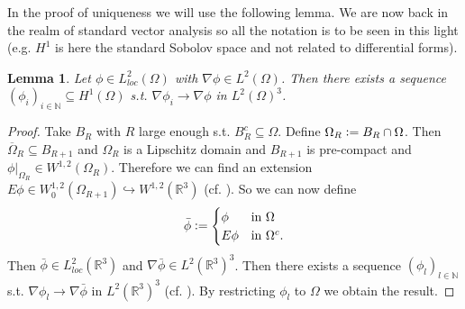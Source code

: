\documentclass[12pt,a4paper]{article}
\numberwithin{equation}{subsection}
\newtheorem{lemma}{Lemma}[section]
\numberwithin{lemma}{subsection}
\theoremstyle{definition}
\newcommand{\naturalnum}{\mathbb{N}}
\newcommand{\real}{\mathbb{R}}
\begin{document}
In the proof of uniqueness we will use the following lemma. 
We are now back in the realm of standard vector analysis so all the notation
is to be seen in this light (e.g. $H^1$ is here the standard Sobolov space 
and not related to differential forms).

\begin{lemma}\label{lem:gradient_sequence}
    Let $\phi \in L^2_{loc}(\Omega)$ with $\nabla \phi \in L^2(\Omega)$. Then 
    there exists a sequence $(\phi_i)_{i \in \naturalnum} \subseteq H^1(\Omega)$
    s.t. $\nabla \phi_i \rightarrow \nabla \phi$ in $L^2(\Omega)^3$.
\end{lemma}
\begin{proof}
    Take $B_R$ with $R$ large enough s.t. $B_R^c \subseteq \Omega$. 
    Define $\Omega_R \vcentcolon= B_R \cap \Omega$. Then 
    $\overline{\Omega}_R \subseteq B_{R+1}$ and $\Omega_R$ is a Lipschitz 
    domain and $B_{R+1}$ is pre-compact and
    $\phi|_{\Omega_R} \in W^{1,2}(\Omega_R)$. Therefore we can find an extension
    $E\phi \in W_0^{1,2}(\Omega_{R+1}) \hookrightarrow W^{1,2}(\mathbb{R}^3)$
    (cf. \cite[Thm.\,5.2.1]{sobolev}). So we can now define
    \begin{align*}
    \bar{\phi} \vcentcolon=
    \begin{cases}
        \phi & \mbox{in $\Omega$}\\
        E\phi & \mbox{in $\Omega^c$.}\\
    \end{cases}
    \end{align*}
    Then $\bar{\phi} \in L^2_{loc}(\real^3)$ and 
    $\nabla \bar{\phi} \in L^2(\real^3)^3$. 
    Then there exists a sequence $(\phi_l) _{l \in \naturalnum}$ s.t.
    $\nabla \phi_l \rightarrow \nabla \bar{\phi}$ in $L^2(\real^3)^3$ 
    (cf. \cite[Lemma\,1.1]{simader}). By restricting $\phi_l$ to $\Omega$ 
    we obtain the result.
\end{proof}

\end{document}
